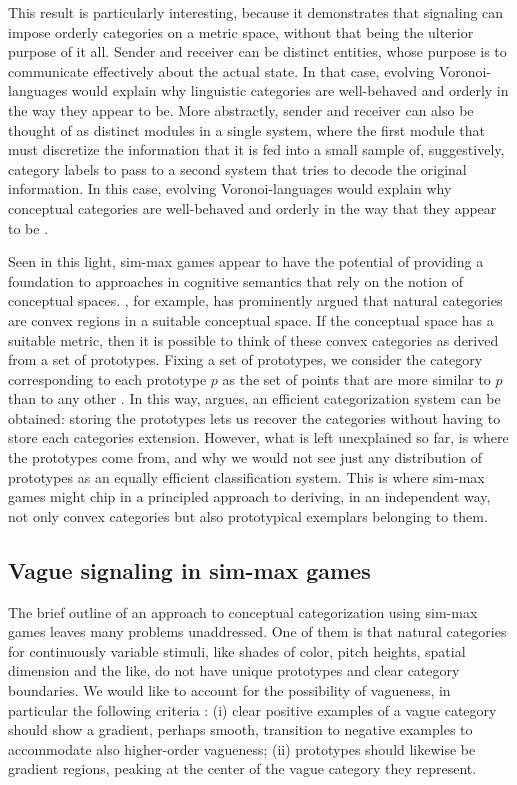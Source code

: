 This result is particularly interesting, because it demonstrates that
signaling can impose orderly categories on a metric space, without
that being the ulterior purpose of it all. Sender and receiver can be
distinct entities, whose purpose is to communicate effectively
about the actual state. In that case, evolving Voronoi-languages would
explain why linguistic categories are well-behaved and orderly in the
way they appear to be. More abstractly, sender and receiver can also
be thought of as distinct modules in a single system, where the first
module that must discretize the information that it is fed into a
small sample of, suggestively, category labels to pass to a second
system that tries to decode the original information. In this case,
evolving Voronoi-languages would explain why conceptual categories are
well-behaved and orderly in the way that they appear to be
\citep[see][for more on this latter
interpretation]{OConnor2013:Evolving-Percep}.

Seen in this light, sim-max games appear to have the potential of
providing a foundation to approaches in cognitive semantics that rely
on the notion of conceptual spaces.
\citet[][70--77]{Gardenfors2000:Conceptual-Spac}, for example, has
prominently argued that natural categories are convex regions in a
suitable conceptual space. If the conceptual space has a suitable
metric, then it is possible to think of these convex categories as
derived from a set of prototypes. Fixing a set of prototypes, we
consider the category corresponding to each prototype $p$ as the set
of points that are more similar to $p$ than to any other
\citep[e.g.][]{OkabeBoots2000:Spatial-Tessell}. In this way,
\citet{Gardenfors2000:Conceptual-Spac} argues, an efficient
categorization system can be obtained: storing the prototypes lets us
recover the categories without having to store each categories
extension. However, what is left unexplained so far, is where the
prototypes come from, and why we would not see just any distribution
of prototypes as an equally efficient classification system. This is
where sim-max games might chip in a principled approach to deriving,
in an independent way, not only convex categories but also
prototypical exemplars belonging to them.


\subsection{Vague signaling in sim-max games}

The brief outline of an approach to conceptual categorization using
sim-max games leaves many problems unaddressed. One of them is that
natural categories for continuously variable stimuli, like shades of
color, pitch heights, spatial dimension and the like, do not have
unique prototypes and clear category boundaries. We would like to
account for the possibility of vagueness, in particular the following
criteria
\citep[e.g.][]{Sainsbury1991:Is-There-Higher,KeefeSmith1997:Vagueness:-A-Re,Smith2008:Vagueness-and-D}:
(i) clear positive examples of a vague category should show a
gradient, perhaps smooth, transition to negative examples to
accommodate also higher-order vagueness; (ii) prototypes should
likewise be gradient regions, peaking at the center of the vague
category they represent.


